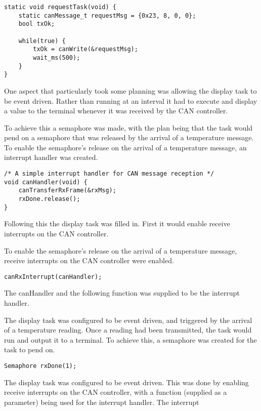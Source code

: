 \documentclass[]{report}
\begin{document}
			\begin{lstlisting}
static void requestTask(void) {
	static canMessage_t requestMsg = {0x23, 8, 0, 0};
	bool txOk;
				
	while(true) {
		txOk = canWrite(&requestMsg);
		wait_ms(500);
	}
}
			\end{lstlisting}
			
			One aspect that particularly took some planning was allowing the display task to be event driven. Rather than running at an interval it had to execute and display a value to the terminal whenever it was received by the CAN controller.
			
			To achieve this a semaphore was made, with the plan being that the task would pend on a semaphore that was released by the arrival of a temperature message. To enable the semaphore's release on the arrival of a temperature message, an interrupt handler was created.
			
\begin{lstlisting}
/* A simple interrupt handler for CAN message reception */
void canHandler(void) {
	canTransferRxFrame(&rxMsg);
	rxDone.release();
}
\end{lstlisting}
			
			Following this the display task was filled in. First it would enable receive interrupts on the CAN controller.
			
			To enable the semaphore's release on the arrival of a temperature message, receive interrupts on the CAN controller were enabled.
\begin{lstlisting}
canRxInterrupt(canHandler);
\end{lstlisting}
			
			The canHandler 
			 and the following function was supplied to be the interrupt handler.
			

			
			The display task was configured to be event driven, and triggered by the arrival of a temperature reading. Once a reading had been transmitted, the task would run and output it to a terminal. To achieve this, a semaphore was created for the task to pend on.
			\begin{lstlisting}
Semaphore rxDone(1);
			\end{lstlisting}
			
			
			The display task was configured to be event driven. This was done by enabling receive interrupts on the CAN controller, with a function (supplied as a parameter) being used for the interrupt handler. The interrupt 
		
\end{document}
